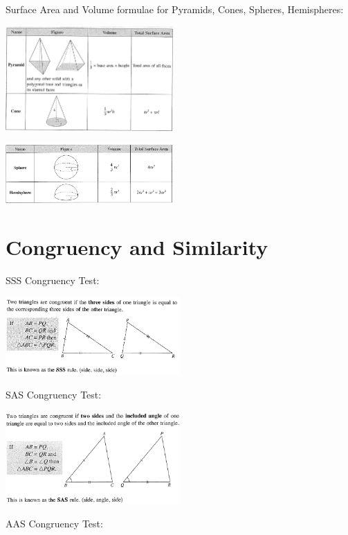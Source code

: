 \documentclass[twocolumn]{article}
\begin{document}
\bigskip 

\noindent 
Surface Area and Volume formulae for Pyramids, Cones, Spheres, Hemispheres:

\bigskip 

\includegraphics[width=0.48\textwidth]{83.png}

\includegraphics[width=0.48\textwidth]{88.png}

\newpage

\section*{Congruency and Similarity}

\noindent 
SSS Congruency Test:

\includegraphics[width=0.5\textwidth]{90.png}

\bigskip 

\noindent 
SAS Congruency Test:

\includegraphics[width=0.5\textwidth]{91.png}

\bigskip 

\noindent 
AAS Congruency Test:
\end{document}
